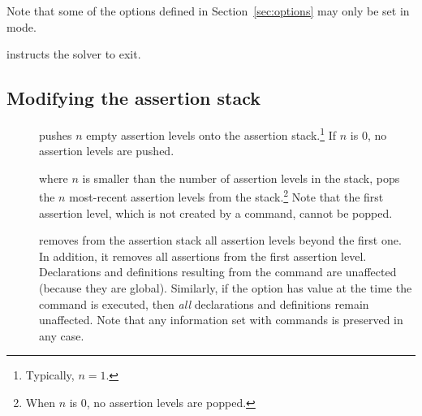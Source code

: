 \begin{description}
Note that some of the options defined in Section~\ref{sec:options} 
may only be set in  mode.
\smallskip

%
\item[\expr{(exit)}]
instructs the solver to exit.
\end{description}


\subsection{Modifying the assertion stack}

\begin{description}
%
\item[] 
pushes $n$ empty assertion levels onto the assertion stack.\footnote{%
Typically, $n=1$.
}
If $n$ is $0$, no assertion levels are pushed.
\smallskip

%
\item[] where $n$ is smaller than the number of assertion levels
in the stack, pops the $n$ most-recent assertion levels from the stack.\footnote{%
When $n$ is $0$, no assertion levels are popped.
}
Note that the first assertion level, 
which is not created by a  command, 
cannot be popped.
\smallskip

%
\item[] removes from the assertion stack 
all assertion levels beyond the first one.
In addition, it removes all assertions from the first assertion level.
Declarations and definitions resulting from the  command 
are unaffected (because they are global).
Similarly, if the option  has value 
at the time the command is executed, then \emph{all} declarations and definitions
remain unaffected.
Note that any information set with  commands is preserved 
in any case.

\end{description}


